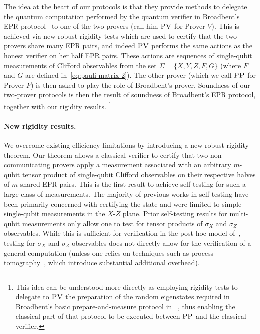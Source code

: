 The idea at the heart of our protocols is that they provide methods to delegate the quantum computation performed by the quantum verifier in Broadbent's EPR protocol~\cite{broadbent15howtoverify} to one of the two provers (call him $\textsc{PV}$ for Prover $V$). This is achieved via new robust rigidity tests which are used to certify that the two provers share many EPR pairs, and indeed $\textsc{PV}$ performs the same actions as the honest verifier on her half EPR pairs. These actions are sequences of single-qubit measurements of Clifford observables from the set $\Sigma = \{X,Y,Z,F,G\}$ (where $F$ and $G$ are defined in~\eqref{eq:pauli-matrix-2}). The other prover (which we call $\textsc{PP}$ for Prover $P$) is then asked to play the role of Broadbent's prover. Soundness of our two-prover protocols is then the result of soundness of Broadbent's EPR protocol, together with our rigidity results. \footnote{This idea can  be understood more directly as employing rigidity tests to delegate to $\textsc{PV}$ the preparation of the random eigenstates required in Broadbent's basic prepare-and-measure protocol in~ \cite{broadbent15howtoverify}, thus enabling the classical part of that protocol to be executed between $\textsc{PP}$ and the classical verifier.}


\paragraph{New rigidity results.} 
We overcome existing efficiency limitations by introducing a new robust rigidity theorem. Our theorem allows a classical verifier to certify that two non-communicating provers apply a measurement associated with an arbitrary $m$-qubit tensor product of single-qubit Clifford observables on their respective halves of $m$ shared EPR pairs.
This is the first result to achieve self-testing for such a large class of
measurements. The majority of previous works in self-testing have been primarily
concerned with certifying the state and were limited to simple single-qubit
measurements in the $X$-$Z$ plane. Prior self-testing results for multi-qubit
measurements only allow one to test for tensor products of $\sigma_X$ and $\sigma_Z$
observables. While this is sufficient for verification in the post-hoc model
of~\cite{hajdusek2015posthoc}, testing for $\sigma_X$ and $\sigma_Z$ observables
does not directly allow for the verification of a general computation (unless
one relies on techniques such as process
tomography~\cite{reichardt2012classical}, which introduce substantial additional
overhead).  

